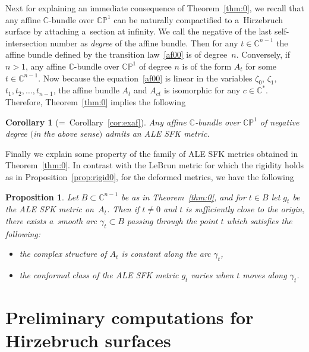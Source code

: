 \documentclass[pdftex]{sigma}
\numberwithin{equation}{section}
\newtheorem{Corollary}[Theorem]{Corollary}
\newtheorem{Proposition}[Theorem]{Proposition}
{\theoremstyle{definition}
\newtheorem{Definition}[Theorem]{Definition}
\newtheorem{Remark}[Theorem]{Remark}
}
\begin{document}
Next for explaining an immediate consequence of Theorem~\ref{thm:0}, we recall that any af\/f\/ine $\mathbb{C}$-bundle
over $\mathbb{CP}^1$ can be naturally compactif\/ied to a~Hirzebruch surface by attaching a~section at inf\/inity.
We call the negative of the last self-intersection number as \textit{degree} of the af\/f\/ine bundle.
Then for any $t\in\mathbb{C}^{n-1}$ the af\/f\/ine bundle def\/ined by the transition law~\eqref{af00} is of degree~$n$.
Conversely, if $n>1$, any af\/f\/ine $\mathbb{C}$-bundle over $\mathbb{CP}^1$ of degree $n$ is of the form $A_t$ for
some $t\in\mathbb{C}^{n-1}$.
Now because the equation~\eqref{af00} is linear in the variables $\zeta_0$, $\zeta_1$, $t_1, t_2,\dots,t_{n-1}$, the af\/f\/ine
bundle $A_t$ and $A_{ct}$ is isomorphic for any $c\in \mathbb{C}^*$.
Therefore, Theorem~\ref{thm:0} implies the following

\begin{Corollary}[=~Corollary~\ref{cor:exaf}]
Any affine $\mathbb{C}$-bundle over $\mathbb{CP}^1$ of negative degree $($in the above sense$)$ admits an ALE SFK metric.
\end{Corollary}

Finally we explain some property of the family of ALE SFK metrics obtained in Theorem~\ref{thm:0}.
In contrast with the LeBrun metric for which the rigidity holds as in Proposition~\ref{prop:rigid0}, for the deformed
metrics, we have the following

\begin{Proposition}\label{prop:var}
Let $B\subset\mathbb{C}^{n-1}$ be as in Theorem~{\rm \ref{thm:0}}, and for $t\in B$ let $g_t$ be the ALE SFK metric on~$A_t$.
Then if $t\neq 0$ and $t$ is sufficiently close to the origin, there exists a~smooth arc $\gamma_t \subset B$
passing through the point $t$ which satisfies the following:
\begin{itemize}\itemsep=0pt
\item[$(i)$] the complex structure of $A_t$ is constant along the arc $\gamma_t$,
\item[$(ii)$] the conformal class of the ALE SFK metric $g_t$ varies when $t$ moves along $\gamma_t$.
\end{itemize}
\end{Proposition}

\section{Preliminary computations for Hirzebruch surfaces}
\label{s:Hirz}
\end{document}
